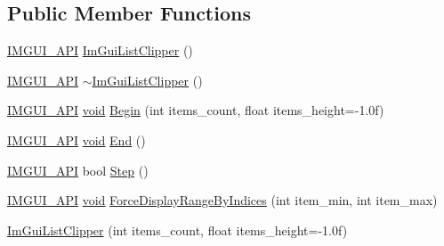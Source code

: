 \subsection*{Public Member Functions}
\begin{DoxyCompactItemize}
\item 
\hyperlink{imgui_8h_a43829975e84e45d1149597467a14bbf5}{I\+M\+G\+U\+I\+\_\+\+A\+PI} \hyperlink{structImGuiListClipper_af42c878888a906ead11489a600cb6768}{Im\+Gui\+List\+Clipper} ()
\item 
\hyperlink{imgui_8h_a43829975e84e45d1149597467a14bbf5}{I\+M\+G\+U\+I\+\_\+\+A\+PI} \hyperlink{structImGuiListClipper_ada915f0ae4446df73c1a2372bde65293}{$\sim$\+Im\+Gui\+List\+Clipper} ()
\item 
\hyperlink{imgui_8h_a43829975e84e45d1149597467a14bbf5}{I\+M\+G\+U\+I\+\_\+\+A\+PI} \hyperlink{imgui__impl__opengl3__loader_8h_ac668e7cffd9e2e9cfee428b9b2f34fa7}{void} \hyperlink{structImGuiListClipper_a746fbd724a41dbe88fef4875a2b1e9c7}{Begin} (int items\+\_\+count, float items\+\_\+height=-\/1.\+0f)
\item 
\hyperlink{imgui_8h_a43829975e84e45d1149597467a14bbf5}{I\+M\+G\+U\+I\+\_\+\+A\+PI} \hyperlink{imgui__impl__opengl3__loader_8h_ac668e7cffd9e2e9cfee428b9b2f34fa7}{void} \hyperlink{structImGuiListClipper_a3e6aec0db317985319a78513fc2c8068}{End} ()
\item 
\hyperlink{imgui_8h_a43829975e84e45d1149597467a14bbf5}{I\+M\+G\+U\+I\+\_\+\+A\+PI} bool \hyperlink{structImGuiListClipper_ac3e115812c3c4e5a39578a7aa955379a}{Step} ()
\item 
\hyperlink{imgui_8h_a43829975e84e45d1149597467a14bbf5}{I\+M\+G\+U\+I\+\_\+\+A\+PI} \hyperlink{imgui__impl__opengl3__loader_8h_ac668e7cffd9e2e9cfee428b9b2f34fa7}{void} \hyperlink{structImGuiListClipper_a65dabd7fe41071f079c83a3615f48be9}{Force\+Display\+Range\+By\+Indices} (int item\+\_\+min, int item\+\_\+max)
\item 
\hyperlink{structImGuiListClipper_aa102d8c5cde9d8bf8dc5707c1d6fb96e}{Im\+Gui\+List\+Clipper} (int items\+\_\+count, float items\+\_\+height=-\/1.\+0f)
\end{DoxyCompactItemize}
